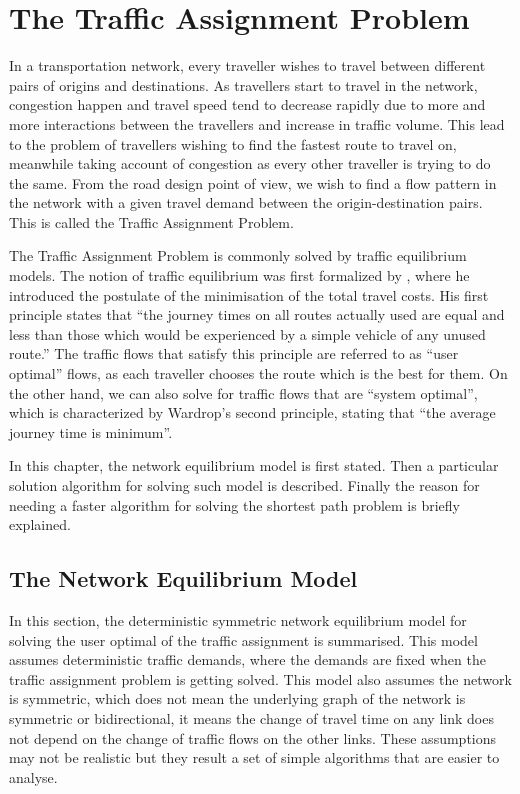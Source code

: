 \chapter{The Traffic Assignment Problem} \label{chap:ta}

In a transportation network,
every traveller wishes to travel between different pairs of origins and destinations.
As travellers start to travel in the network,
congestion happen and travel speed tend to decrease rapidly due to more and more interactions between the travellers and increase in traffic volume.
This lead to the problem of travellers wishing to find the fastest route to travel on,
meanwhile taking account of congestion as every other traveller is trying to do the same.
From the road design point of view,
we wish to find a flow pattern in the network with a given travel demand between the origin-destination pairs. 
This is called the Traffic Assignment Problem.

The Traffic Assignment Problem is commonly solved by traffic equilibrium models.
The notion of traffic equilibrium was first formalized by \cite{Wardrop},
where he introduced the postulate of the minimisation of the total travel costs.
His first principle states that ``the journey times on all routes actually used are equal and less than those which would be experienced by a simple vehicle of any unused route.''
The traffic flows that satisfy this principle are referred to as ``user optimal'' flows,
as each traveller chooses the route which is the best for them.
On the other hand,
we can also solve for traffic flows that are ``system optimal'',
which is characterized by Wardrop's second principle, stating that ``the average journey time is minimum''.

In this chapter,
the network equilibrium model is first stated.
Then a particular solution algorithm for solving such model is described.
Finally the reason for needing a faster algorithm for solving the shortest path problem is briefly explained.

\section{The Network Equilibrium Model}
In this section,
the deterministic symmetric network equilibrium model for solving the user optimal of the traffic assignment is summarised.
This model assumes deterministic traffic demands,
where the demands are fixed when the traffic assignment problem is getting solved.
This model also assumes the network is symmetric,
which does not mean the underlying graph of the network is symmetric or bidirectional,
it means the change of travel time on any link does not depend on the change of traffic flows on the other links.
These assumptions may not be realistic but they result a set of simple algorithms that are easier to analyse.

